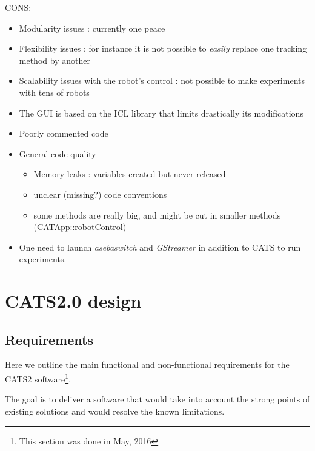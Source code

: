 \documentclass{styles/assisi}
\begin{document}
CONS:
\begin{itemize}
  \item Modularity issues : currently one peace
  \item Flexibility issues : for instance it is not possible to {\it easily} replace one tracking method by another
  \item Scalability issues with the robot's control : not possible to make experiments with tens of robots
  \item The GUI is based on the ICL library that limits drastically its modifications
  \item Poorly commented code
  \item General code quality
      \begin{itemize}
        \item{Memory leaks : variables created but never released}
        \item{unclear (missing?) code conventions}
        \item{some methods are really big, and might be cut in smaller methods (CATApp::robotControl) }
      \end{itemize}
  \item One need to launch {\it asebaswitch} and {\it GStreamer} in addition to CATS to run experiments.
\end{itemize}


\chapter{CATS2.0 design}\label{chap:cats2}

\section {Requirements}
Here we outline the main functional and non-functional requirements for the CATS2 software\footnote{This section was done in May, 2016}.

The goal is to deliver a software that would take into account the strong points of existing solutions and would resolve the known limitations.
\end{document}
